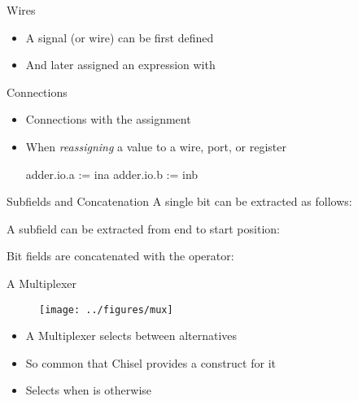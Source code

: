 \begin{frame}[fragile]{Wires}
\begin{itemize}
\item A signal (or wire) can be first defined
\item And later assigned an expression with \code{:=}
\end{itemize}
\end{frame}

\begin{frame}[fragile]{Connections}
\begin{itemize}
\item Connections with the \code{:=} assignment
\item When \emph{reassigning} a value to a wire, port, or register
\begin{chisel}
  adder.io.a := ina
  adder.io.b := inb
\end{chisel}
\end{itemize}
\end{frame}

\begin{frame}[fragile]{Subfields and Concatenation}
A single bit can be extracted as follows:

\noindent A subfield can be extracted from end to start position:

\noindent Bit fields are concatenated with the \code{\#\#} operator:
\end{frame}


\begin{frame}[fragile]{A Multiplexer}
\begin{figure}
  \texttt{[image: ../figures/mux]}
\end{figure}
\begin{itemize}
\item A Multiplexer selects between alternatives
\item So common that Chisel provides a construct for it
\item Selects  when  is  otherwise 
\end{itemize}
\end{frame}

